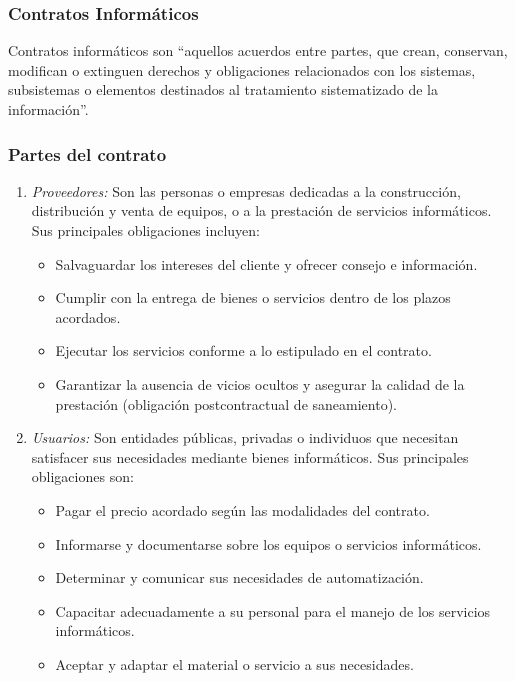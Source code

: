 \documentclass{templateNote}
\begin{document}
\subsubsection{Contratos Informáticos}
Contratos informáticos son “aquellos acuerdos entre partes, que crean, conservan, modifican o extinguen derechos y obligaciones relacionados con los sistemas, subsistemas o elementos destinados al tratamiento sistematizado de la información”. 

\subsubsection*{Partes del contrato}

\begin{enumerate}
    \item \textit{Proveedores:} Son las personas o empresas dedicadas a la construcción, distribución y venta de equipos, o a la prestación de servicios informáticos. Sus principales obligaciones incluyen:
    \begin{itemize}
        \item Salvaguardar los intereses del cliente y ofrecer consejo e información.
        \item Cumplir con la entrega de bienes o servicios dentro de los plazos acordados.
        \item Ejecutar los servicios conforme a lo estipulado en el contrato.
        \item Garantizar la ausencia de vicios ocultos y asegurar la calidad de la prestación (obligación postcontractual de saneamiento).
    \end{itemize}
    \item \textit{Usuarios:} Son entidades públicas, privadas o individuos que necesitan satisfacer sus necesidades mediante bienes informáticos. Sus principales obligaciones son:
    \begin{itemize}
        \item Pagar el precio acordado según las modalidades del contrato.
        \item Informarse y documentarse sobre los equipos o servicios informáticos.
        \item Determinar y comunicar sus necesidades de automatización.
        \item Capacitar adecuadamente a su personal para el manejo de los servicios informáticos.
        \item Aceptar y adaptar el material o servicio a sus necesidades.
    \end{itemize}
\end{enumerate}
\end{document}
